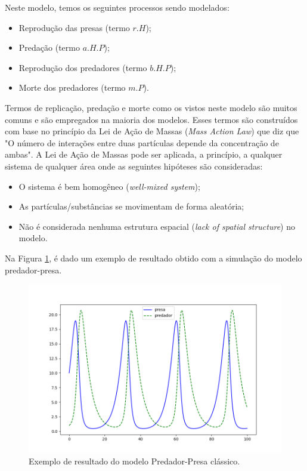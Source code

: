\documentclass[
	12pt,				%
	openright,			%
	oneside,			%
	a4paper,			%
	main=brazil,
	english,			%
	]{ufsj-abntex2}
\begin{document}
Neste modelo, temos os seguintes processos sendo modelados: 
\begin{itemize}
    \item Reprodução das presas (termo $r.H$);
    \item Predação (termo $a.H.P$);
    \item Reprodução dos predadores (termo $b.H.P$);
    \item Morte dos predadores (termo $m.P$). 
\end{itemize}

Termos de replicação, predação e morte como os vistos neste modelo são muitos comuns e são empregados na maioria dos modelos. Esses termos são construídos com base no princípio da Lei de Ação de Massas (\textit{Mass Action Law}) que diz que "O número de interações entre duas partículas depende da concentração de ambas". A Lei de Ação de Massas pode ser aplicada, a princípio, a qualquer sistema de qualquer área onde as seguintes hipóteses são consideradas: 
    \begin{itemize}
        \item O sistema é bem homogêneo (\textit{well-mixed system}); 
        \item As partículas/substâncias se movimentam de forma aleatória; 
        \item Não é considerada nenhuma estrutura espacial (\textit{lack of spatial structure}) no modelo.
    \end{itemize}

Na Figura \ref{fig:hostprey}, é dado um exemplo de resultado obtido com a simulação do modelo predador-presa. 

\begin{figure}[h]
    \centering
    \includegraphics[scale=0.6]{imgs/hostprey.png} 
    \caption{Exemplo de resultado do modelo Predador-Presa clássico.}
    \label{fig:hostprey}
\end{figure}
\end{document}
